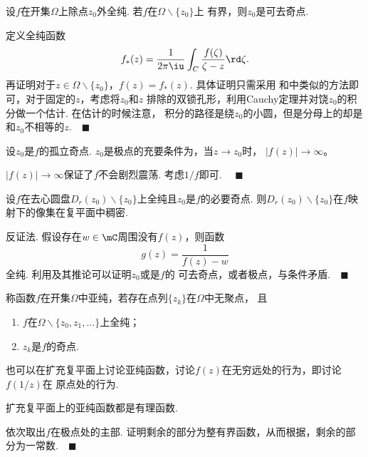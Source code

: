   \begin{thm}[Riemann]
    \label{thm: Riemann、可去奇点}
    设$f$在开集$\Omega$上除点$z_0$外全纯. 若$f$在$\Omega\backslash\{z_0\}$上
    有界，则$z_0$是可去奇点.
  \end{thm}
  \proof
    定义全纯函数
    \[
      f_*(z) = \frac{1}{2\pi\iu}\int_C\frac{f(\zeta)}{\zeta-z}\rd\zeta.
    \]
    再证明对于$z\in\Omega\backslash\{z_0\}$，$f(z)=f_*(z)$. 具体证明只需采用
    和中类似的方法即可，对于固定的$z$，考虑将$z_0$和$z$
    排除的双锁孔形，利用Cauchy定理并对饶$z_0$的积分做一个估计. 在估计的时候注意，
    积分的路径是绕$z_0$的小圆，但是分母上的却是和$z_0$不相等的$z$.$\quad\blacksquare$

  \begin{cor}
    设$z_0$是$f$的孤立奇点. $z_0$是极点的充要条件为，当$z\to z_0$时，
    $|f(z)|\to\infty$。
  \end{cor}
  \remark
    $|f(z)|\to\infty$保证了$f$不会剧烈震荡.
  \proof
    考虑$1/f$即可. $\quad\blacksquare$

  \begin{thm}
    设$f$在去心圆盘$D_r(z_0)\backslash\{z_0\}$上全纯且$z_0$是$f$的必要奇点.
    则$D_r(z_0)\backslash\{z_0\}$在$f$映射下的像集在复平面中稠密.
  \end{thm}
  \proof
    反证法. 假设存在$w\in\mC$周围没有$f(z)$，则函数
    \[
      g(z) = \frac{1}{f(z)-w}
    \]
    全纯. 利用及其推论可以证明$z_0$或是$f$的
    可去奇点，或者极点，与条件矛盾.$\quad\blacksquare$

  \begin{defi}[亚纯]
    称函数$f$在开集$\Omega$中亚纯，若存在点列$\{z_k\}$在$\Omega$中无聚点，
    且
    \begin{enumerate}
      \item $f$在$\Omega\backslash\{z_0,z_1,\dots\}$上全纯；
      \item ${z_k}$是$f$的奇点.
    \end{enumerate}
  \end{defi}
  \remark
    也可以在扩充复平面上讨论亚纯函数，讨论$f(z)$在无穷远处的行为，即讨论$f(1/z)$在
    原点处的行为.

  \begin{thm}
    扩充复平面上的亚纯函数都是有理函数.
  \end{thm}
  \proof
    依次取出$f$在极点处的主部. 证明剩余的部分为整有界函数，从而根据，剩余的部分为一常数.$\quad\blacksquare$

